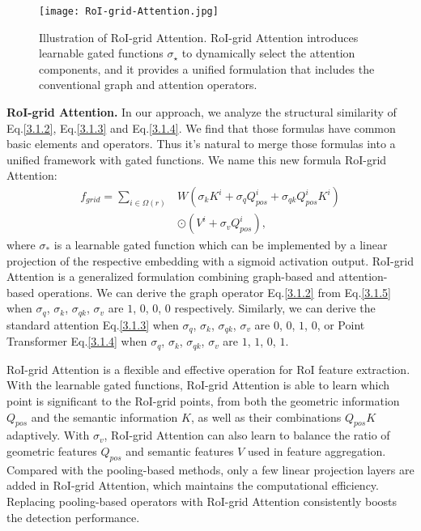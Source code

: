 \documentclass[10pt,twocolumn,letterpaper]{article}
\begin{document}
\begin{figure}[!t]
\centering
\texttt{[image: RoI-grid-Attention.jpg]}
\caption{Illustration of RoI-grid Attention. RoI-grid Attention introduces learnable gated functions $\sigma_{\star}$ to dynamically select the attention components, and it provides a unified formulation that includes the conventional graph and attention operators.}
\label{fig_attention}
\vspace{-4mm}
\end{figure}

\textbf{RoI-grid Attention.} In our approach, we analyze the structural similarity of Eq.\ref{3.1.2}, Eq.\ref{3.1.3} and Eq.\ref{3.1.4}. We find that those formulas have common basic elements and operators. Thus it's natural to merge those formulas into a unified framework with gated functions. We name this new formula RoI-grid Attention:
\begin{equation} \label{3.1.5}
\begin{aligned}
f_{grid} = \sum_{i \in \Omega(r)} & W(\sigma_{k} K^{i} + \sigma_{q} Q^{i}_{pos} + \sigma_{qk} Q^{i}_{pos}K^{i})\\& \odot (V^{i} + \sigma_{v} Q^{i}_{pos}),
\end{aligned}
\end{equation}
where $\sigma_{\ast}$ is a learnable gated function which can be implemented by a linear projection of the respective embedding with a sigmoid activation output. RoI-grid Attention is a generalized formulation combining graph-based and attention-based operations. We can derive the graph operator Eq.\ref{3.1.2} from Eq.\ref{3.1.5} when $\sigma_{q}$, $\sigma_{k}$, $\sigma_{qk}$, $\sigma_{v}$ are $1$, $0$, $0$, $0$ respectively. Similarly, we can derive the standard attention Eq.\ref{3.1.3} when $\sigma_{q}$, $\sigma_{k}$, $\sigma_{qk}$, $\sigma_{v}$ are $0$, $0$, $1$, $0$, or Point Transformer Eq.\ref{3.1.4} when $\sigma_{q}$, $\sigma_{k}$, $\sigma_{qk}$, $\sigma_{v}$ are $1$, $1$, $0$, $1$.

RoI-grid Attention is a flexible and effective operation for RoI feature extraction. With the learnable gated functions, RoI-grid Attention is able to learn which point is significant to the RoI-grid points, from both the geometric information $Q_{pos}$ and the semantic information $K$, as well as their combinations $Q_{pos}K$ adaptively. With $\sigma_{v}$, RoI-grid Attention can also learn to balance the ratio of geometric features $Q_{pos}$ and semantic features $V$ used in feature aggregation. Compared with the pooling-based methods, only a few linear projection layers are added in RoI-grid Attention, which maintains the computational efficiency. Replacing pooling-based operators with RoI-grid Attention consistently boosts the detection performance.
\end{document}
